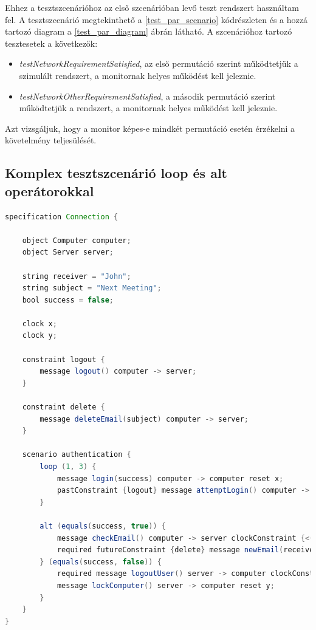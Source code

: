 Ehhez a tesztszcenárióhoz az első szcenárióban levő teszt rendszert használtam fel.
A tesztszcenárió megtekinthető a \ref{test_par_scenario} kódrészleten és a hozzá tartozó diagram a \ref{test_par_diagram} ábrán látható.
A szcenárióhoz tartozó tesztesetek a következők:

\begin{itemize}
    \item \textit{testNetworkRequirementSatisfied}, az első permutáció szerint működtetjük a szimulált rendszert, a monitornak helyes működést kell jeleznie.
    \item \textit{testNetworkOtherRequirementSatisfied}, a második permutáció szerint működtetjük a rendszert, a monitornak helyes működést kell jeleznie.
\end{itemize}

Azt vizsgáljuk, hogy a monitor képes-e mindkét permutáció esetén érzékelni a követelmény teljesülését.

\subsection{Komplex tesztszcenárió loop és alt operátorokkal}

\begin{lstlisting}[language=java, frame=single, float=ht!, caption={Komplex teszteset szcenáriója.},captionpos=b,label=test_complex_scenario]
specification Connection {

    object Computer computer;
    object Server server;

    string receiver = "John";
    string subject = "Next Meeting";
    bool success = false;

    clock x;
    clock y;

    constraint logout {
        message logout() computer -> server;
    }

    constraint delete {
        message deleteEmail(subject) computer -> server;
    }

    scenario authentication {
        loop (1, 3) {
            message login(success) computer -> computer reset x;
            pastConstraint {logout} message attemptLogin() computer -> server reset y;
        }

        alt (equals(success, true)) {
            message checkEmail() computer -> server clockConstraint {<(x, 2)};
            required futureConstraint {delete} message newEmail(receiver, subject) computer -> server reset x;
        } (equals(success, false)) {
            required message logoutUser() server -> computer clockConstraint {>(y, 3)};
            message lockComputer() server -> computer reset y;
        }
    }
}
\end{lstlisting}

